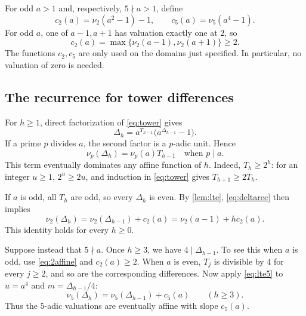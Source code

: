 \documentclass[11pt,a4paper]{article}
\theoremstyle{definition}
\begin{document}
For odd $a>1$ and, respectively, $5\nmid a>1$, define
\begin{equation}
c_2(a)=\nu_2(a^2-1)-1,
\qquad c_5(a)=\nu_5(a^4-1).
\label{eq:cs}
\end{equation}
For odd $a$, one of $a-1,a+1$ has valuation exactly one at $2$, so
\begin{equation}
c_2(a)=\max\{\nu_2(a-1),\nu_2(a+1)\}\ge2.
\label{eq:c2max}
\end{equation}
The functions $c_2,c_5$ are only used on the domains just specified.
In particular, no valuation of zero is needed.

\subsection{The recurrence for tower differences}
For $h\ge1$, direct factorization of \eqref{eq:tower} gives
\begin{equation}
\Delta_h=a^{T_{h-1}}\bigl(a^{\Delta_{h-1}}-1\bigr).
\label{eq:deltarec}
\end{equation}
If a prime $p$ divides $a$, the second factor is a $p$-adic unit. Hence
\begin{equation}
\nu_p(\Delta_h)=\nu_p(a)T_{h-1}
\quad\text{when }p\mid a.
\label{eq:nonunit}
\end{equation}
This term eventually dominates any affine function of $h$.
Indeed, $T_h\ge2^h$: for an integer $u\ge1$, $2^u\ge2u$, and induction
in \eqref{eq:tower} gives $T_{h+1}\ge2T_h$.

If $a$ is odd, all $T_h$ are odd, so every $\Delta_h$ is even.
By \cref{lem:lte}, \eqref{eq:deltarec} then implies
\begin{equation}
\nu_2(\Delta_h)=\nu_2(\Delta_{h-1})+c_2(a)
=\nu_2(a-1)+h c_2(a).
\label{eq:2affine}
\end{equation}
This identity holds for every $h\ge0$.

Suppose instead that $5\nmid a$. Once $h\ge3$, we have
$4\mid\Delta_{h-1}$. To see this when $a$ is odd, use
\eqref{eq:2affine} and $c_2(a)\ge2$. When $a$ is even, $T_j$ is divisible
by $4$ for every $j\ge2$, and so are the corresponding differences.
Now apply \eqref{eq:lte5} to $u=a^4$ and $m=\Delta_{h-1}/4$:
\begin{equation}
\nu_5(\Delta_h)=\nu_5(\Delta_{h-1})+c_5(a)
\qquad(h\ge3).
\label{eq:5affine}
\end{equation}
Thus the $5$-adic valuations are eventually affine with slope $c_5(a)$.
\end{document}
